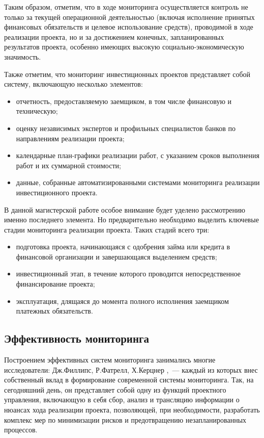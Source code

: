\documentclass[12pt,a4paper]{article} %
\begin{document}
Таким образом, отметим, что в ходе мониторинга осуществляется контроль не только за текущей операционной деятельностью (включая исполнение принятых финансовых обязательств и целевое использование средств), проводимой в ходе реализации проекта, но и за достижением конечных, запланированных результатов проекта, особенно имеющих высокую социально-экономическую значимость.

Также отметим, что мониторинг инвестиционных проектов представляет собой систему, включающую несколько элементов\cite{Antonov2014}:

\begin{itemize}
	\item отчетность, предоставляемую заемщиком, в том числе финансовую и техническую;
	\item оценку независимых экспертов и профильных специалистов банков по направлениям реализации проекта;
	\item календарные план-графики реализации работ, с указанием сроков выполнения работ и их суммарной стоимости;
	\item данные, собранные автоматизированными системами мониторинга реализации инвестиционного проекта.
\end{itemize}

В данной магистерской работе особое внимание будет уделено рассмотрению именно последнего элемента. Но предварительно необходимо выделить ключевые стадии мониторинга реализации проекта. Таких стадий всего три:
\begin{itemize}
	\item 	подготовка проекта, начинающаяся с одобрения займа или кредита в финансовой организации и завершающаяся выделением средств;
	\item 	инвестиционный этап, в течение которого проводится непосредственное финансирование проекта;
	\item 	эксплуатация, длящаяся до момента полного исполнения заемщиком платежных обязательств.
\end{itemize}

\subsection{Эффективность мониторинга}

Построением эффективных систем мониторинга занимались многие исследователи: Дж.Филлипс, Р.Фатрелл, Х.Керцнер \cite{Filli, Fatrell, Kerzner},~--- каждый из которых внес собственный вклад в формирование современной системы мониторинга. Так, на сегодняшний день, он представляет собой одну из функций проектного управления, включающую в себя сбор, анализ и трансляцию информации о нюансах хода реализации проекта, позволяющей, при необходимости, разработать комплекс мер по минимизации рисков и предотвращению незапланированных процессов.
\end{document}
